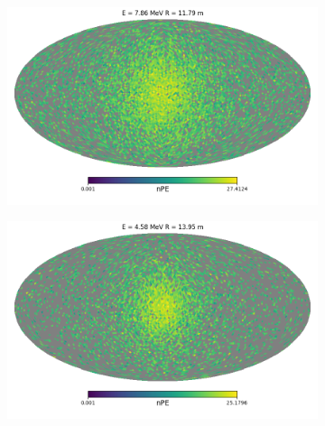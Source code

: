 \documentclass[../main.tex]{subfiles}
\begin{document}
\begin{figure}
  \begin{subfigure}[t]{0.48\linewidth}
    \includegraphics[width=\linewidth]{images/jgnn/harmonic/event_idx_300.png}
    \caption{}
  \end{subfigure}
  \hfill
  \begin{subfigure}[t]{0.48\linewidth}
    \includegraphics[width=\linewidth]{images/jgnn/harmonic/event_idx_500.png}
    \caption{}
  \end{subfigure}



\end{figure}
\end{document}
